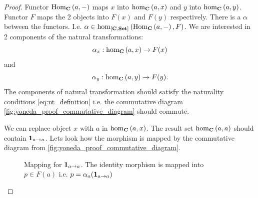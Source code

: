 \begin{lemma}[Yoneda]
\begin{proof}
Functor
$\mathrm{Hom}_{\mathbf{C}}\left(a, -\right)$ maps $x$ into $\catmset[C]{a}{x}$ and $y$ into 
$\catmset[C]{a}{y}$. Functor $F$ maps the 2 objects into $F(x)$ and
$F(y)$ respectively. There is a  $\alpha$ between
the functors. I.e.  $\alpha \in
\catmset[\funcat{C}{Set}]{\catcovhom{C}{a}}{F}$. We are interested in
2 components of the natural transformations:
\[
\alpha_x : \catmset[C]{a}{x} \to F(x)
\]
and
\[
\alpha_y : \catmset[C]{a}{y} \to F(y).
\]
The components of natural transformation should satisfy the naturality
conditions \eqref{eq:nt_definition} i.e. the commutative diagram
\cref{fig:yoneda_proof_commutative_diagram} should commute.

We can replace object $x$ with $a$ in $\catmset[C]{a}{x}$. The result
set $\catmset[C]{a}{a}$ should contain  $\mathbf{1}_{ a \to a }$.
Lets look how the morphism is mapped by the commutative diagram from
\cref{fig:yoneda_proof_commutative_diagram}.

\begin{figure}
  \centering
  \caption{Mapping for $\mathbf{1}_{ a \to a }$. The identity morphism is mapped into
    $p \in F(a)$ i.e. $p = \alpha_a(\mathbf{1}_{ a \to a })$}
  \label{fig:yoneda_proof_idm}
\end{figure}


\end{proof}
\end{lemma}
